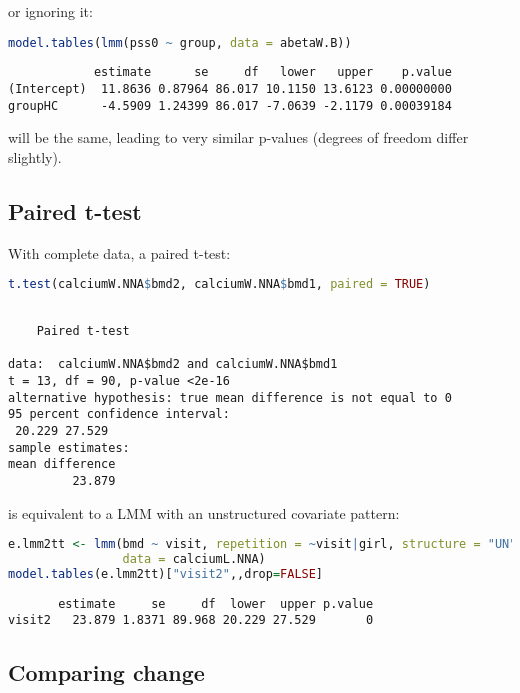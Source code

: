 \documentclass[12pt]{article}
\begin{document}
or ignoring it:
\begin{lstlisting}[language=r,numbers=none]
model.tables(lmm(pss0 ~ group, data = abetaW.B))
\end{lstlisting}

\label{}
\begin{verbatim}
            estimate      se     df   lower   upper    p.value
(Intercept)  11.8636 0.87964 86.017 10.1150 13.6123 0.00000000
groupHC      -4.5909 1.24399 86.017 -7.0639 -2.1179 0.00039184
\end{verbatim}


will be the same, leading to very similar p-values (degrees of freedom
differ slightly).

\clearpage
\subsection{Paired t-test}
\label{sec:org708984c}

With complete data, a paired t-test:
\begin{lstlisting}[language=r,numbers=none]
t.test(calciumW.NNA$bmd2, calciumW.NNA$bmd1, paired = TRUE)
\end{lstlisting}

\label{}
\begin{verbatim}

	Paired t-test

data:  calciumW.NNA$bmd2 and calciumW.NNA$bmd1
t = 13, df = 90, p-value <2e-16
alternative hypothesis: true mean difference is not equal to 0
95 percent confidence interval:
 20.229 27.529
sample estimates:
mean difference 
         23.879
\end{verbatim}

is equivalent to a LMM with an unstructured covariate pattern:
\begin{lstlisting}[language=r,numbers=none]
e.lmm2tt <- lmm(bmd ~ visit, repetition = ~visit|girl, structure = "UN",
                data = calciumL.NNA)
model.tables(e.lmm2tt)["visit2",,drop=FALSE]
\end{lstlisting}

\label{}
\begin{verbatim}
       estimate     se     df  lower  upper p.value
visit2   23.879 1.8371 89.968 20.229 27.529       0
\end{verbatim}


\clearpage
\subsection{Comparing change}
\label{sec:org396095b}
\end{document}
